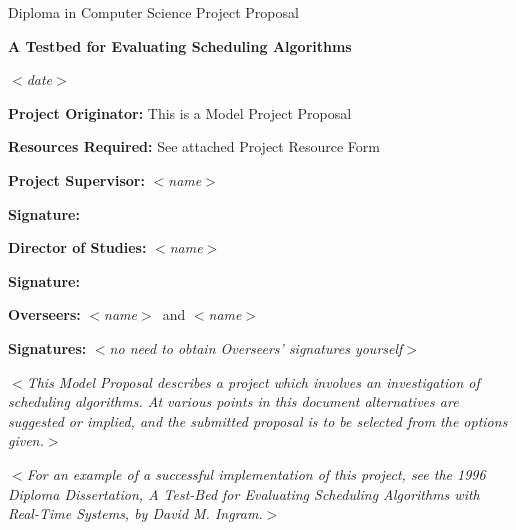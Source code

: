 \documentclass[12pt]{article}
\newcommand{\al}{$<$}
\newcommand{\ar}{$>$}
\begin{document}
\thispagestyle{empty}

\rightline{\large\al\emph{name}\ar}
\medskip
\rightline{\large\al\emph{College}\ar}
\medskip
\rightline{\large\al\emph{CRSID}\ar}

\vfil

\centerline{\large Diploma in Computer Science Project Proposal}
\vspace{0.4in}
\centerline{\Large\bf A Testbed for Evaluating Scheduling Algorithms}
\vspace{0.3in}
\centerline{\large \al\emph{date}\ar}

\vfil

{\bf Project Originator:} This is a Model Project Proposal

\vspace{0.1in}

{\bf Resources Required:} See attached Project Resource Form

\vspace{0.5in}

{\bf Project Supervisor:} \al\emph{name}\ar

\vspace{0.2in}

{\bf Signature:}

\vspace{0.5in}

{\bf Director of Studies:}  \al\emph{name}\ar

\vspace{0.2in}

{\bf Signature:}

\vspace{0.5in}

{\bf Overseers:} \al\emph{name}\ar\ and \al\emph{name}\ar

\vspace{0.2in}

{\bf Signatures:} \al\emph{no need to obtain Overseers' signatures yourself}\ar

\vfil
\eject

\al\emph{This Model Proposal describes a project which involves an
  investigation of scheduling algorithms.  At various points in this
  document\/ {\rm alternatives} are suggested or implied, and the
  submitted proposal is to be selected from the options given.}\ar

\al\emph{For an example of a successful implementation of this
  project, see the 1996 Diploma Dissertation, {\rm A Test-Bed for
    Evaluating Scheduling Algorithms with Real-Time Systems}, by David
  M. Ingram.}\ar
\end{document}
